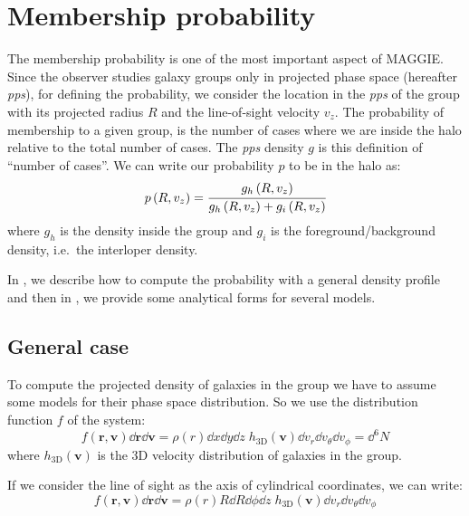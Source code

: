\section{Membership probability}
\label{sec:probability}

The membership probability is one of the most important aspect of MAGGIE\@.
Since the observer studies galaxy groups only in projected phase space
(hereafter \emph{pps}), for defining the probability, we consider the location
in the \emph{pps} of the group with its projected radius $R$ and the
line-of-sight velocity $v_z$. The probability of membership to a given group,
is the number of cases where we are inside the halo relative to the total
number of cases. The \emph{pps} density $g$ is this definition of ``number of
cases''. We can write our probability $p$ to be in the halo as:
%
\begin{equation}
    \label{eq:probability}
    p \left(R, v_z\right)= \cfrac{g_h \left(R, v_z\right)}
    {g_h \left(R, v_z\right) + g_i \left(R, v_z\right)}
\end{equation}
%
where $g_h$ is the \pps{} density inside the group and $g_i$ is the
foreground/background \pps{} density, i.e.\ the interloper density.

In , we describe how to compute the probability
with a general density profile and then in
, we provide some analytical forms for
several models.

\subsection{General case}
\label{sub:general_case}

To compute the projected density of galaxies in the group we have to assume
some models for their phase space distribution. So we use the distribution
function $f$ of the system:
%
\begin{equation}
    f\left(\textbf{r},\textbf{v}\right)\dd\textbf{r}\dd\textbf{v}
    =\rho\left(r\right)\dd{x}\dd{y}\dd{z}\;
    h_\mathrm{3D}\left(\textbf{v}\right)
    \dd v_r\dd v_\theta\dd v_\phi=
    \dd^6 N
\end{equation}
%
where $h_\mathrm{3D}\left(\textbf{v}\right)$ is the 3D velocity distribution of
galaxies in the group.

If we consider the line of sight as the axis of cylindrical coordinates, we can
write:
%
\begin{equation}
    f\left(\textbf{r},\textbf{v}\right)\dd\textbf{r}\dd\textbf{v}=
    \rho\left(r\right)R\dd{R}\dd\phi\dd{z}\;
    h_\mathrm{3D}\left(\textbf{v}\right)
    \dd{v_r}\dd{v_\theta}\dd{v_\phi}
\end{equation}

